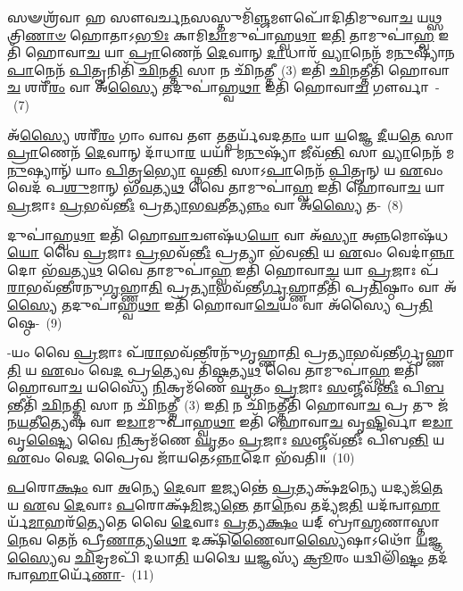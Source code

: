 𑌸𑍟𑌶𑍍𑌰᳴𑌵𑌾 𑌹 𑌸𑍗𑌵𑌰𑍍𑌚\-\ul{𑌨}\-𑌸𑌸𑍍𑌤𑍁𑌮𑌿᳴\-\ul{𑌞𑍍𑌜}\-𑌮𑍗𑌪𑍋᳴𑌦𑌿𑌤𑌿𑌮𑍁𑌵𑌾\-\ul{𑌚} 𑌯\-\ul{𑌥𑍍𑌸}\-𑌤𑍍𑌰𑌿\-\ul{𑌣𑌾}\-\-\ul{𑍞} 𑌹𑍋𑌤𑌾\-𑌽\-\ul{𑌭𑍂𑌃} 𑌕𑌾𑌮𑌿\-\ul{𑌡𑌾}\-𑌮𑍁𑌪𑌾॑𑌹𑍍𑌵\-\ul{𑌥𑌾} 𑌇\-\ul{𑌤𑌿} 𑌤𑌾𑌮𑍁𑌪𑌾॑\-\ul{𑌹𑍍𑌵} 𑌇𑌤𑌿᳴ 𑌹𑍋𑌵𑌾\-\ul{𑌚} 𑌯𑌾 \ul{𑌪𑍍𑌰𑌾}\-𑌣𑍇𑌨᳴ \ul{𑌦𑍇}\-𑌵𑌾𑌨𑍍 \ul{𑌦𑌾}\-𑌧𑌾𑌰᳴ \ul{𑌵𑍍𑌯𑌾}\-𑌨𑍇𑌨᳴ 𑌮\-\ul{𑌨𑍁}\-𑌷𑍍𑌯𑌾᳴𑌨\-\ul{𑌪𑌾}\-𑌨𑍇𑌨᳴ \ul{𑌪𑌿}\-𑌤𑍄𑌨𑌿𑌤𑌿᳴ \ul{𑌛𑌿}\-𑌨\-\ul{𑌤𑍍𑌤𑌿} 𑌸𑌾 𑌨 𑌛𑌿᳴\-\ul{𑌨}\-𑌤𑍍𑌤𑍀~(3) 𑌇𑌤𑌿᳴ \ul{𑌛𑌿}\-𑌨𑌤𑍍𑌤𑍀𑌤𑌿᳴ 𑌹𑍋𑌵𑌾\-\ul{𑌚} 𑌶𑌰𑍀᳴\-\ul{𑌰𑌂} 𑌵𑌾 𑌅᳴\-\ul{𑌸𑍍𑌯𑍈} 𑌤𑌦𑍁𑌪𑌾॑𑌹𑍍𑌵\-\ul{𑌥𑌾} 𑌇𑌤𑌿᳴ 𑌹𑍋𑌵𑌾\-\ul{𑌚} 𑌗𑍗𑌰𑍍𑌵𑌾~-~(7)

𑌅᳴\-\ul{𑌸𑍍𑌯𑍈} 𑌶𑌰𑍀᳴\-\ul{𑌰𑌂} 𑌗𑌾𑌂 𑌵𑌾𑌵 𑌤𑍗 𑌤𑌤𑍍𑌪𑌰𑍍𑌯᳴𑌵𑌦\-\ul{𑌤𑌾𑌂} 𑌯𑌾 \ul{𑌯}\-𑌜𑍍𑌞𑍇 \ul{𑌦𑍀}\-𑌯\-\ul{𑌤𑍇} 𑌸𑌾 \ul{𑌪𑍍𑌰𑌾}\-𑌣𑍇𑌨᳴ \ul{𑌦𑍇}\-𑌵𑌾𑌨𑍍 𑌦𑌾᳴𑌧𑌾\-\ul{𑌰} 𑌯𑌯𑌾᳴ 𑌮\-\ul{𑌨𑍁}\-𑌷𑍍𑌯𑌾᳴ 𑌜𑍀𑌵᳴\-\ul{𑌨𑍍𑌤𑌿} 𑌸𑌾 \ul{𑌵𑍍𑌯𑌾}\-𑌨𑍇𑌨᳴ 𑌮\-\ul{𑌨𑍁}\-𑌷𑍍𑌯𑌾𑌨𑍍᳴ 𑌯𑌾𑌂 \ul{𑌪𑌿}\-𑌤𑍃\-\ul{𑌭𑍍𑌯𑍋} 𑌘𑍍𑌨\-\ul{𑌨𑍍𑌤𑌿} 𑌸𑌾\-𑌽\-\ul{𑌪𑌾}\-𑌨𑍇𑌨᳴ \ul{𑌪𑌿}\-𑌤𑍄𑌨𑍍 𑌯 \ul{𑌏}\-𑌵𑌂 𑌵𑍇𑌦᳴ 𑌪\-\ul{𑌶𑍁}\-𑌮𑌾𑌨𑍍 𑌭᳴\-\ul{𑌵}\-𑌤𑍍𑌯\-\ul{𑌥} 𑌵𑍈 𑌤𑌾𑌮𑍁𑌪𑌾॑\-\ul{𑌹𑍍𑌵} 𑌇𑌤𑌿᳴ 𑌹𑍋𑌵𑌾\-\ul{𑌚} 𑌯𑌾 \ul{𑌪𑍍𑌰}\-𑌜𑌾𑌃 \ul{𑌪𑍍𑌰}\-𑌭𑌵᳴\-\ul{𑌨𑍍𑌤𑍀𑌃} 𑌪𑍍𑌰\-\ul{𑌤𑍍𑌯𑌾}\-𑌭\-\ul{𑌵}\-𑌤𑍀𑌤𑍍𑌯\-\ul{𑌨𑍍𑌨𑌂} 𑌵𑌾 𑌅᳴\-\ul{𑌸𑍍𑌯𑍈} 𑌤-~(8)

𑌦𑍁𑌪𑌾॑𑌹𑍍𑌵\-\ul{𑌥𑌾} 𑌇𑌤𑌿᳴ 𑌹𑍋\-\ul{𑌵𑌾}\-𑌚𑍗𑌷᳴𑌧\-\ul{𑌯𑍋} 𑌵𑌾 𑌅᳴\-\ul{𑌸𑍍𑌯𑌾} 𑌅\-\ul{𑌨𑍍𑌨}\-𑌮𑍋𑌷᳴𑌧\-\ul{𑌯𑍋} 𑌵𑍈 \ul{𑌪𑍍𑌰}\-𑌜𑌾𑌃 \ul{𑌪𑍍𑌰}\-𑌭𑌵᳴\-\ul{𑌨𑍍𑌤𑍀𑌃} 𑌪𑍍𑌰𑌤𑍍𑌯𑌾 𑌭᳴𑌵\-\ul{𑌨𑍍𑌤𑌿} 𑌯 \ul{𑌏}\-𑌵𑌂 𑌵𑍇𑌦𑌾॑\-\ul{𑌨𑍍𑌨𑌾}\-𑌦𑍋 𑌭᳴\-\ul{𑌵}\-𑌤𑍍𑌯\-\ul{𑌥} 𑌵𑍈 𑌤𑌾𑌮𑍁𑌪𑌾॑\-\ul{𑌹𑍍𑌵} 𑌇𑌤𑌿᳴ 𑌹𑍋𑌵𑌾\-\ul{𑌚} 𑌯𑌾 \ul{𑌪𑍍𑌰}\-𑌜𑌾𑌃 𑌪᳴\-\ul{𑌰𑌾}\-𑌭𑌵᳴𑌨𑍍𑌤𑍀𑌰𑌨𑍁\-\ul{𑌗𑍃}\-𑌹𑍍𑌣𑌾\-\ul{𑌤𑌿} 𑌪𑍍𑌰\-\ul{𑌤𑍍𑌯𑌾}\-𑌭𑌵᳴𑌨𑍍𑌤𑍀\-\ul{𑌰𑍍𑌗𑍃}\-𑌹𑍍𑌣𑌾𑌤𑍀𑌤𑌿᳴ 𑌪𑍍𑌰\-\ul{𑌤𑌿}\-𑌷𑍍𑌠𑌾𑌂 𑌵𑌾 𑌅᳴\-\ul{𑌸𑍍𑌯𑍈} 𑌤𑌦𑍁𑌪𑌾॑𑌹𑍍𑌵\-\ul{𑌥𑌾} 𑌇𑌤𑌿᳴ 𑌹𑍋𑌵𑌾\-\ul{𑌚𑍇}\-𑌯𑌂 𑌵𑌾 𑌅᳴𑌸𑍍𑌯𑍈 𑌪𑍍𑌰\-\ul{𑌤𑌿}\-𑌷𑍍𑌠𑍇-~(9)

-𑌯𑌂 𑌵𑍈 \ul{𑌪𑍍𑌰}\-𑌜𑌾𑌃 𑌪᳴\-\ul{𑌰𑌾}\-𑌭𑌵᳴\-\ul{𑌨𑍍𑌤𑍀}\-𑌰𑌨𑍁᳴𑌗𑍃𑌹𑍍𑌣𑌾\-\ul{𑌤𑌿} 𑌪𑍍𑌰\-\ul{𑌤𑍍𑌯𑌾}\-𑌭𑌵᳴𑌨𑍍𑌤𑍀𑌰𑍍𑌗𑍃𑌹𑍍𑌣𑌾\-\ul{𑌤𑌿} 𑌯 \ul{𑌏}\-𑌵𑌂 𑌵𑍇\-\ul{𑌦} 𑌪𑍍𑌰\-\ul{𑌤𑍍𑌯𑍇}\-𑌵 𑌤𑌿᳴\-\ul{𑌷𑍍𑌠}\-𑌤𑍍𑌯\-\ul{𑌥} 𑌵𑍈 𑌤𑌾𑌮𑍁𑌪𑌾॑\-\ul{𑌹𑍍𑌵} 𑌇𑌤𑌿᳴ 𑌹𑍋𑌵𑌾\-\ul{𑌚} 𑌯𑌸𑍍𑌯𑍈᳴ \ul{𑌨𑌿}\-𑌕𑍍𑌰𑌮᳴𑌣𑍇 \ul{𑌘𑍃}\-𑌤𑌂 \ul{𑌪𑍍𑌰}\-𑌜𑌾𑌃 \ul{𑌸}\-𑌞𑍍𑌜𑍀𑌵᳴\-\ul{𑌨𑍍𑌤𑍀𑌃} 𑌪𑌿\-\ul{𑌬}\-𑌨𑍍𑌤𑍀𑌤𑌿᳴ \ul{𑌛𑌿}\-𑌨\-\ul{𑌤𑍍𑌤𑌿} 𑌸𑌾 𑌨 𑌛𑌿᳴\-\ul{𑌨}\-𑌤𑍍𑌤𑍀~(3) 𑌇\-\ul{𑌤𑌿} 𑌨 𑌛𑌿᳴\-\ul{𑌨}\-𑌤𑍍𑌤𑍀𑌤𑌿᳴ 𑌹𑍋𑌵𑌾\-\ul{𑌚} 𑌪𑍍𑌰 𑌤𑍁 𑌜᳴𑌨\-\ul{𑌯}\-𑌤𑍀\-\ul{𑌤𑍍𑌯𑍇}\-𑌷 𑌵𑌾 𑌇\-\ul{𑌡𑌾}\-𑌮𑍁𑌪𑌾॑𑌹𑍍𑌵\-\ul{𑌥𑌾} 𑌇𑌤𑌿᳴ 𑌹𑍋𑌵𑌾\-\ul{𑌚} 𑌵𑍃\-\ul{𑌷𑍍𑌟𑌿}\-𑌰𑍍𑌵𑌾 𑌇\-\ul{𑌡𑌾} 𑌵𑍃\-\ul{𑌷𑍍𑌟𑍍𑌯𑍈} 𑌵𑍈 \ul{𑌨𑌿}\-𑌕𑍍𑌰𑌮᳴𑌣𑍇 \ul{𑌘𑍃}\-𑌤𑌂 \ul{𑌪𑍍𑌰}\-𑌜𑌾𑌃 \ul{𑌸}\-𑌞𑍍𑌜𑍀𑌵᳴𑌨𑍍𑌤𑍀𑌃 𑌪𑌿𑌬\-\ul{𑌨𑍍𑌤𑌿} 𑌯 \ul{𑌏}\-𑌵𑌂 𑌵𑍇\-\ul{𑌦} 𑌪𑍍𑌰𑍈𑌵 𑌜𑌾᳴𑌯𑌤𑍇\-𑌽\-\ul{𑌨𑍍𑌨𑌾}\-𑌦𑍋 𑌭᳴𑌵𑌤𑌿॥~(10)

{\anuvakamend[{𑌗𑍗𑌰𑍍𑌵𑌾 𑌅᳴\-\ul{𑌸𑍍𑌯𑍈} 𑌤𑌤𑍍 𑌪𑍍𑌰᳴\-\ul{𑌤𑌿}\-𑌷𑍍𑌠𑌾\-𑌽𑌹𑍍𑌵᳴\-\ul{𑌥𑌾} 𑌇𑌤𑌿᳴ 𑌵𑌿𑍞\-\ul{𑌶}\-𑌤𑌿𑌶𑍍𑌚᳴}]}%

\-\ul{𑌪}\-𑌰𑍋\-\ul{𑌕𑍍𑌷𑌂} 𑌵𑌾 \ul{𑌅}\-𑌨𑍍𑌯𑍇 \ul{𑌦𑍇}\-𑌵𑌾 \ul{𑌇}\-𑌜𑍍𑌯𑌨𑍍𑌤𑍇॑ \ul{𑌪𑍍𑌰}\-𑌤𑍍𑌯𑌕𑍍𑌷᳴\-\ul{𑌮}\-𑌨𑍍𑌯𑍇 𑌯𑌦𑍍𑌯𑌜᳴\-\ul{𑌤𑍇} 𑌯 \ul{𑌏}\-𑌵 \ul{𑌦𑍇}\-𑌵𑌾𑌃 \ul{𑌪}\-𑌰𑍋𑌕𑍍𑌷᳴\-\ul{𑌮𑌿}\-𑌜𑍍𑌯\-\ul{𑌨𑍍𑌤𑍇} 𑌤𑌾\-\ul{𑌨𑍇}\-𑌵 𑌤𑌦𑍍𑌯᳴𑌜\-\ul{𑌤𑌿} 𑌯𑌦᳴𑌨𑍍𑌵𑌾\-\ul{𑌹𑌾}\-𑌰𑍍𑌯᳴\-\ul{𑌮𑌾}\-𑌹𑌰᳴\-\ul{𑌤𑍍𑌯𑍇}\-𑌤𑍇 𑌵𑍈 \ul{𑌦𑍇}\-𑌵𑌾𑌃 \ul{𑌪𑍍𑌰}\-𑌤𑍍𑌯\-\ul{𑌕𑍍𑌷𑌂} 𑌯𑌦𑍍 𑌬𑍍𑌰𑌾॑\-\ul{𑌹𑍍𑌮}\-𑌣𑌾𑌸𑍍𑌤𑌾\-\ul{𑌨𑍇}\-𑌵 𑌤𑍇𑌨᳴ 𑌪𑍍𑌰𑍀\-\ul{𑌣𑌾}\-𑌤𑍍𑌯\-\ul{𑌥𑍋} 𑌦𑌕𑍍𑌷𑌿᳴\-\ul{𑌣𑍈}\-𑌵𑌾\-\ul{𑌸𑍍𑌯𑍈}\-𑌷𑌾\-𑌽𑌥𑍋᳴ \ul{𑌯}\-𑌜𑍍𑌞\-\ul{𑌸𑍍𑌯𑍈}\-𑌵 \ul{𑌛𑌿}\-𑌦𑍍𑌰𑌮𑌪𑌿᳴ 𑌦𑌧𑌾\-\ul{𑌤𑌿} 𑌯𑌦𑍍𑌵𑍈 \ul{𑌯}\-𑌜𑍍𑌞𑌸𑍍𑌯᳴ \ul{𑌕𑍍𑌰𑍂}\-𑌰𑌂 𑌯𑌦𑍍𑌵𑌿𑌲𑌿᳴\-\ul{𑌷𑍍𑌟𑌂} 𑌤𑌦᳴𑌨𑍍𑌵𑌾\-\ul{𑌹𑌾}\-𑌰𑍍𑌯𑍇᳴\-\ul{𑌣𑌾}\--~(11)


